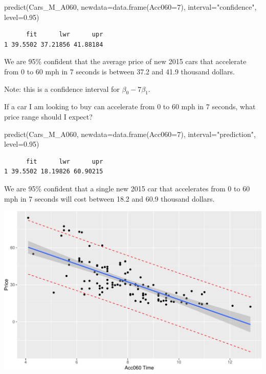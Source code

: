 \documentclass[
  letterpaper,
  DIV=11,
  numbers=noendperiod]{scrreprt}
\newenvironment{Shaded}{\begin{snugshade}}{\end{snugshade}}
\newcommand{\AttributeTok}[1]{\textcolor[rgb]{0.40,0.45,0.13}{#1}}
\newcommand{\DecValTok}[1]{\textcolor[rgb]{0.68,0.00,0.00}{#1}}
\newcommand{\FloatTok}[1]{\textcolor[rgb]{0.68,0.00,0.00}{#1}}
\newcommand{\FunctionTok}[1]{\textcolor[rgb]{0.28,0.35,0.67}{#1}}
\newcommand{\NormalTok}[1]{\textcolor[rgb]{0.00,0.23,0.31}{#1}}
\newcommand{\StringTok}[1]{\textcolor[rgb]{0.13,0.47,0.30}{#1}}
\begin{document}
\begin{Shaded}
\begin{Highlighting}[]
\FunctionTok{predict}\NormalTok{(Cars\_M\_A060, }\AttributeTok{newdata=}\FunctionTok{data.frame}\NormalTok{(}\AttributeTok{Acc060=}\DecValTok{7}\NormalTok{), }\AttributeTok{interval=}\StringTok{"confidence"}\NormalTok{, }\AttributeTok{level=}\FloatTok{0.95}\NormalTok{)}
\end{Highlighting}
\end{Shaded}

\begin{verbatim}
      fit      lwr      upr
1 39.5502 37.21856 41.88184
\end{verbatim}

We are 95\% confident that the average price of new 2015 cars that
accelerate from 0 to 60 mph in 7 seconds is between 37.2 and 41.9
thousand dollars.

Note: this is a confidence interval for \(\beta_0 -7\beta_1\).

If a car I am looking to buy can accelerate from 0 to 60 mph in 7
seconds, what price range should I expect?

\begin{Shaded}
\begin{Highlighting}[]
\FunctionTok{predict}\NormalTok{(Cars\_M\_A060, }\AttributeTok{newdata=}\FunctionTok{data.frame}\NormalTok{(}\AttributeTok{Acc060=}\DecValTok{7}\NormalTok{), }\AttributeTok{interval=}\StringTok{"prediction"}\NormalTok{, }\AttributeTok{level=}\FloatTok{0.95}\NormalTok{)}
\end{Highlighting}
\end{Shaded}

\begin{verbatim}
      fit      lwr      upr
1 39.5502 18.19826 60.90215
\end{verbatim}

We are 95\% confident that a single new 2015 car that accelerates from 0
to 60 mph in 7 seconds will cost between 18.2 and 60.9 thousand dollars.

\includegraphics{Ch4_files/figure-pdf/unnamed-chunk-85-1.pdf}
\end{document}
